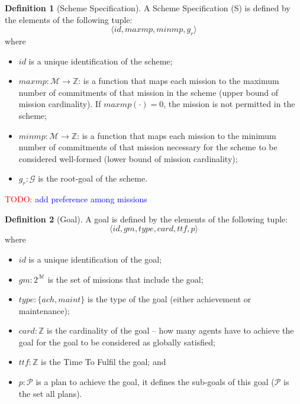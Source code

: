 \documentclass{article}
\newcommand{\todo}[1]{\textcolor{red}{TODO: }\textcolor{blue}{#1}}
\newcommand{\set}[1]{\mathcal{#1}}
\theoremstyle{definition} \newtheorem{definition}{Definition}
\begin{document}
\begin{definition}[Scheme Specification]
  A Scheme Specification (S) is defined by the elements of the following tuple: 
  \begin{displaymath}
    \langle id, maxmp, minmp, g_r \rangle    
  \end{displaymath}
  where 
  \begin{itemize}
  \item $id$ is a unique identification of the scheme;
  \item $maxmp : \set{M} \to \mathbb{Z}$: is a function that maps each
    mission to the maximum number of commitments of that mission in
    the scheme (upper bound of mission cardinality). If $maxmp(\cdot) =
    0$, the mission is not permitted in the scheme;
  \item $minmp : \set{M} \to \mathbb{Z}$: is a function that maps each
    mission to the minimum number of commitments of that mission
    necessary for the scheme to be considered well-formed (lower bound
    of mission cardinality);
 \item $g_r : \set{G}$ is the root-goal of the scheme.
 \end{itemize}  
\end{definition}

\todo{add preference among missions}

\begin{definition}[Goal]
   A goal is defined by the elements of the following tuple: 
  \begin{displaymath}
    \langle id, gm, type, card, ttf, p \rangle    
  \end{displaymath}
  where 
  \begin{itemize}
  \item $id$ is a unique identification of the goal;
  \item $gm : 2^{\set{M}}$ is the set of missions that include the goal;
  \item $type : \{ ach, maint \}$ is the type of the goal (either achievement or maintenance);
  \item $card : \mathbb{Z}$ is the cardinality of the goal -- how many
    agents have to achieve the goal for the goal to be considered as
    globally satisfied;
  \item $ttf : \mathbb{Z}$ is the Time To Fulfil the goal; and
  \item $p : \set{P}$ is a plan to achieve the goal, it defines the
    sub-goals of this goal ($\set{P}$ is the set all plans).
\end{itemize}  
\end{definition}
\end{document}

